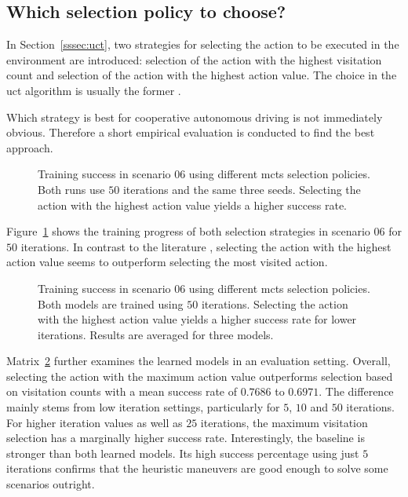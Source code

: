 \subsection{Which selection policy to choose?}\label{ssec:eval_of_final_selection}
In Section~\ref{sssec:uct}, two strategies for selecting the action to be executed in the environment are introduced: selection of the action with the highest visitation count and selection of the action with the highest action value. The choice in the \gls{uct} algorithm is usually the former \cite{browneSurveyMonteCarlo2012}.

Which strategy is best for cooperative autonomous driving is not immediately obvious. Therefore a short empirical evaluation is conducted to find the best approach. 
\begin{figure}[h]
	\centering
	\captionsetup{justification=centering}
	\scalebox{0.9}{
    
    }
	\caption[Training success for different selection policies]{Training success in scenario 06 using different \gls{mcts} selection policies. Both runs use $50$ iterations and the same three seeds. Selecting the action with the highest action value yields a higher success rate.}
\label{fig:final_selection_shaded}
\end{figure}
Figure~\ref{fig:final_selection_shaded} shows the training progress of both selection strategies in scenario 06 for $50$ iterations. In contrast to the literature \cite{browneSurveyMonteCarlo2012}, selecting the action with the highest action value seems to outperform selecting the most visited action.

\begin{figure}[h]
	\centering
	\captionsetup{justification=centering}
	\scalebox{0.9}{
    
    }
	\caption[Evaluation success for different selection policies]{Training success in scenario 06 using different \gls{mcts} selection policies. Both models are trained using $50$ iterations. Selecting the action with the highest action value yields a higher success rate for lower iterations. Results are averaged for three models.}
\label{fig:final_selection_matrix}
\end{figure}
Matrix~\ref{fig:final_selection_matrix} further examines the learned models in an evaluation setting.
Overall, selecting the action with the maximum action value outperforms selection based on visitation counts with a mean success rate of $0.7686$ to $0.6971$. The difference mainly stems from low iteration settings, particularly for $5$, $10$ and $50$ iterations. For higher iteration values as well as $25$ iterations, the maximum visitation selection has a marginally higher success rate. Interestingly, the baseline is stronger than both learned models. Its high success percentage using just $5$ iterations confirms that the heuristic maneuvers are good enough to solve some scenarios outright.


